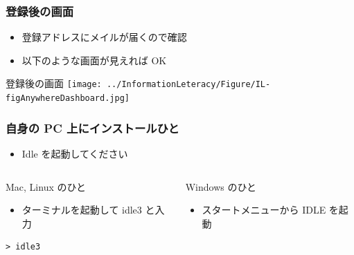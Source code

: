 \begin{frame}
\frametitle{登録後の画面}
  \begin{itemize}
\item 登録アドレスにメイルが届くので確認
\item 以下のような画面が見えれば OK
  \end{itemize}
  \begin{itembox}{登録後の画面}
\texttt{[image: ../InformationLeteracy/Figure/IL-figAnywhereDashboard.jpg]}
  \end{itembox}
\end{frame}
\begin{frame}
\frametitle{自身の PC 上にインストールひと}
  \begin{itemize}
\item Idle を起動してください
  \end{itemize}
  \begin{columns}[t]
    \begin{column}{0.5\textwidth}
      \begin{itembox}{\footnotesize Mac, Linux のひと}
        \begin{itemize}
\scriptsize
\item ターミナルを起動して idle3 と入力
        \end{itemize}
        \begin{verbatim}
> idle3
        \end{verbatim}
      \end{itembox}
    \end{column}
    \begin{column}{0.5\textwidth}
      \begin{itembox}{\footnotesize Windows のひと}
        \begin{itemize}
\item スタートメニューから IDLE を起動
        \end{itemize}
      \end{itembox}
    \end{column}
  \end{columns}
\end{frame}
